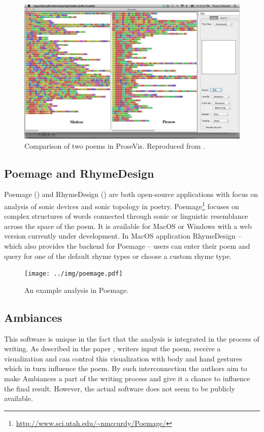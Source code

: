 \begin{figure}[h]\centering
	\includegraphics[scale=0.24]{../img/prosevis.png}
	\caption[Comparison of two poems in ProseVis]{Comparison of two poems in ProseVis. Reproduced from \cite{prosevis2017sourceforge}.}\label{screenshotProsevis}
\end{figure}

\subsection*{Poemage and RhymeDesign}
Poemage (\cite{McCurdy2015poemage}) and RhymeDesign (\cite{McCurdy2015}) are both open-source applications with focus on analysis of sonic devices and sonic topology in poetry. Poemage\footnote{\url{http://www.sci.utah.edu/~nmccurdy/Poemage/}} focuses on complex structures of words connected through sonic or linguistic resemblance across the space of the poem. It is available for MacOS or Windows with a web version currently under development. In MacOS application RhymeDesign -- which also provides the backend for Poemage -- users can enter their poem and query for one of the default rhyme types or choose a custom rhyme type.

\begin{figure}[h]\centering
	\texttt{[image: ../img/poemage.pdf]}
	\caption{An example analysis in Poemage.}\label{screenshotPoemage}
\end{figure}

\subsection*{Ambiances}
This software is unique in the fact that the analysis is integrated in the process of writing. As described in the paper \cite{Meneses2015}, writers input the poem, receive a visualization and can control this visualization with body and hand gestures which in turn influence the poem. By such interconnection the authors aim to make Ambiances a part of the writing process and give it a chance to influence the final result. However, the actual software does not seem to be publicly available.


